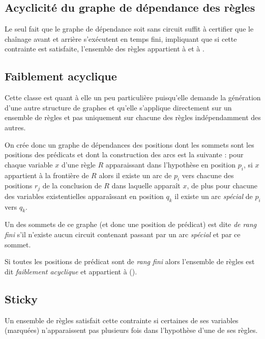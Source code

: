 

\subsection{Acyclicité du graphe de dépendance des règles}\label{classe_agrd}
Le seul fait que le graphe de dépendance soit sans circuit suffit à certifier que le chaînage
avant et arrière s'exécutent en temps fini, impliquant que si cette contrainte est satisfaite,
l'ensemble des règles appartient à \fes et à \fus.

\subsection{Faiblement acyclique}\label{classe_wa}
Cette classe est quant à elle un peu particulière puisqu'elle demande la génération d'une autre
structure de graphes et qu'elle s'applique directement sur un ensemble de règles et pas
uniquement sur chacune des règles indépendamment des autres.

On crée donc un graphe de dépendances des positions dont les sommets sont les positions
des prédicats et dont la construction des arcs est la suivante : pour chaque variable
$x$ d'une règle $R$ apparaissant dans l'hypothèse en position $p_i$, 
si $x$ appartient à la frontière de $R$ alors il existe un arc de $p_i$ vers chacune des
positions $r_j$ de la conclusion de $R$ dans laquelle apparaît $x$, de plus pour chacune
des variables existentielles apparaîssant en position $q_k$ il existe un arc {\em
spécial} de $p_i$ vers $q_k$.

Un des sommets de ce graphe (et donc une position de prédicat) est dite {\em de rang
fini} s'il n'existe aucun circuit contenant passant par un arc {\em spécial} et par ce
sommet.

Si toutes les positions de prédicat sont de {\em rang fini} alors l'ensemble de règles
est dit {\em faiblement acyclique} et appartient à \fes (\cite{nonguarded}).

\subsection{Sticky}\label{classe_sticky}
Un ensemble de règles satisfait cette contrainte si certaines de ses variables (marquées)
n'apparaissent pas plusieurs fois dans l'hypothèse d'une de ses règles.

